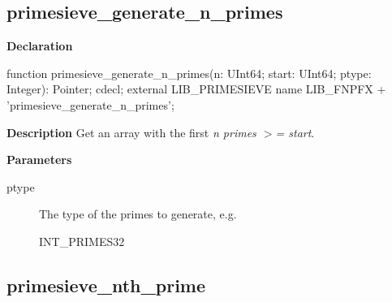 \documentclass{report}
\newif\ifpdf
\begin{document}
\subsection*{primesieve{\_}generate{\_}n{\_}primes}
\fi
\label{primesieve-primesieve_generate_n_primes}
\begin{list}{}{
\setlength{\itemindent}{0cm}
\setlength{\listparindent}{0cm}
\setlength{\leftmargin}{\evensidemargin}
\addtolength{\leftmargin}{\tmplength}
\settowidth{\labelsep}{X}
\addtolength{\leftmargin}{\labelsep}
\setlength{\labelwidth}{\tmplength}
}
\item[\textbf{Declaration}\hfill]
\ifpdf
\begin{flushleft}
\fi
\begin{ttfamily}
function primesieve{\_}generate{\_}n{\_}primes(n: UInt64; start: UInt64; ptype: Integer): Pointer; cdecl; external LIB{\_}PRIMESIEVE name LIB{\_}FNPFX + 'primesieve{\_}generate{\_}n{\_}primes';\end{ttfamily}

\ifpdf
\end{flushleft}
\fi

\par
\item[\textbf{Description}]
Get an array with the first \textit{n primes {$>$}= start}.

\par
\item[\textbf{Parameters}]
\begin{description}
\item[ptype] The type of the primes to generate, e.g. \begin{ttfamily}INT{\_}PRIMES32\end{ttfamily}
\end{description}


\end{list}
\ifpdf
\subsection*{\large{\textbf{primesieve{\_}nth{\_}prime}}\normalsize\hspace{1ex}\hrulefill}
\else
\end{document}
